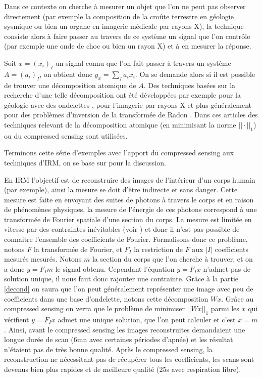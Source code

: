 \begin{exemple}
	Dans ce contexte on cherche à mesurer un objet que l'on ne peut pas observer directement (par exemple la composition de la croûte terrestre en géologie sysmique ou bien un organe en imagerie médicale par rayons X), la technique consiste alors à faire passer au travers de ce système un signal que l'on contrôle (par exemple une onde de choc ou bien un rayon X) et à en mesurer la réponse.

	Soit $x=(x_i)_I$ un signal connu que l'on fait passer à travers un système $A = (a_i)_I$, on obtient donc $y_x = \sum_I a_i x_i$.
	On se demande alors si il est possible de trouver une décomposition atomique de $A$.
	Des techniques basées sur la recherche d'une telle décomposition ont été développées par exemple pour la géologie avec des ondelettes \cite{TomoInv}, pour l'imagerie par rayons X \cite{CSTom} \cite{XraySparse} et plus généralement pour des problèmes d'inversion de la transformée de Radon \cite{RobustSparseRadon} \cite{ViewsSparseRadon}.
	Dans ces articles des techniques relevant de la décomposition atomique (en minimisant la norme $||\cdot||_1$) ou du compressed sensing sont utilisées.
\end{exemple}
\begin{exemple}
	Terminons cette série d'exemples avec l'apport du compressed sensing aux techniques d'IRM, on se base sur \cite{LustigCS} pour la discussion. 
	
	En IRM l'objectif est de reconstruire des images de l'intérieur d'un corps humain (par exemple), ainsi la mesure se doit d'être indirecte et sans danger. 
	Cette mesure est faite en envoyant des suites de photons à travers le corps et en raison de phénomènes physiques, la mesure de l'énergie de ces photons correspond à une transformée de Fourier spatiale d'une section du corps.
	La mesure est limitée en vitesse par des contraintes inévitables (voir \cite{LustigCS}) et donc il n'est pas possible de connaitre l'ensemble des coefficients de Fourier.
	\newline
	Formalisons donc ce problème, notons $F$ la transformée de Fourier, et $F_I$ la restriction de $F$ aux $|I|$ coefficients mesurés mesurés.
	Notons $m$ la section du corps que l'on cherche à trouver, et on a donc $y=F_I m$ le signal obtenu.
	Cependant l'équation $y=F_I x$ n'admet pas de solution unique, il nous faut donc rajouter une contrainte.
	Grâce à la partie \ref{decond} on saura que l'on peut généralement représenter une image avec peu de coefficients dans une base d'ondelette, notons cette décomposition $W x$.
	Grâce au compressed sensing on verra que le problème de minimiser $||Wx||_1$ parmi les $x$ qui vérifient $y = F_I x$ admet une unique solution, que l'on peut calculer et c'est $x=m$. 
	\newline
	Ainsi, avant le compressed sensing les images reconstruites demandaient une longue durée de scan (6mn avec certaines périodes d'apnée) et les résultat n'étaient pas de très bonne qualité.
	Après le compressed sensing, la reconstruction ne nécessitant pas de récupérer tous les coefficients, les scans sont devenus bien plus rapides et de meilleure qualité (25s avec respiration libre).	
\end{exemple}
